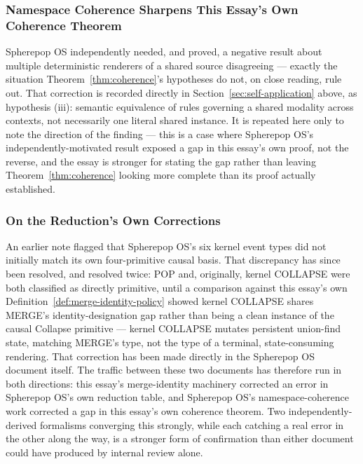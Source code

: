 \documentclass[11pt]{article}
\theoremstyle{definition}
\begin{document}
\subsubsection{Namespace Coherence Sharpens This Essay's Own Coherence Theorem}

Spherepop OS independently needed, and proved, a negative result about multiple deterministic renderers of a shared source disagreeing --- exactly the situation Theorem~\ref{thm:coherence}'s hypotheses do not, on close reading, rule out. That correction is recorded directly in Section~\ref{sec:self-application} above, as hypothesis (iii): semantic equivalence of rules governing a shared modality across contexts, not necessarily one literal shared instance. It is repeated here only to note the direction of the finding --- this is a case where Spherepop OS's independently-motivated result exposed a gap in this essay's own proof, not the reverse, and the essay is stronger for stating the gap rather than leaving Theorem~\ref{thm:coherence} looking more complete than its proof actually established.

\subsubsection{On the Reduction's Own Corrections}

An earlier note flagged that Spherepop OS's six kernel event types did not initially match its own four-primitive causal basis. That discrepancy has since been resolved, and resolved twice: POP and, originally, kernel COLLAPSE were both classified as directly primitive, until a comparison against this essay's own Definition~\ref{def:merge-identity-policy} showed kernel COLLAPSE shares MERGE's identity-designation gap rather than being a clean instance of the causal Collapse primitive --- kernel COLLAPSE mutates persistent union-find state, matching MERGE's type, not the type of a terminal, state-consuming rendering. That correction has been made directly in the Spherepop OS document itself. The traffic between these two documents has therefore run in both directions: this essay's merge-identity machinery corrected an error in Spherepop OS's own reduction table, and Spherepop OS's namespace-coherence work corrected a gap in this essay's own coherence theorem. Two independently-derived formalisms converging this strongly, while each catching a real error in the other along the way, is a stronger form of confirmation than either document could have produced by internal review alone.
\end{document}
